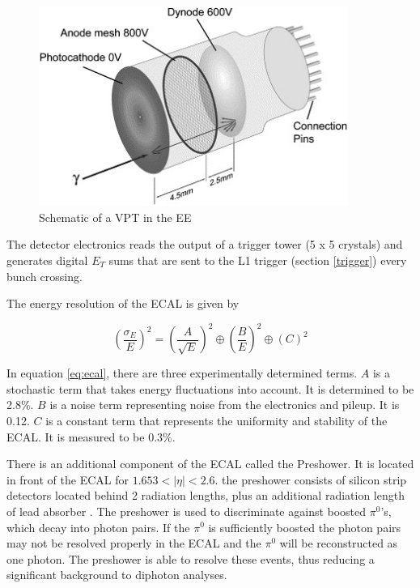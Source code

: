 \documentclass[oneside, letterpaper, oldfontcommands]{memoir}
\begin{document}
\begin{figure}[here]
\includegraphics[width=0.9\textwidth]{vpt.jpg}
\caption{Schematic of a VPT in the EE  \cite{Brown:2007cg}}
\label{fig:VPT}
\end{figure}

\qquad The detector electronics reads the output of a trigger tower (5 x 5 crystals) and generates digital $E_{T}$ sums that are sent to the L1 trigger (section \ref{trigger}) every bunch crossing.

\qquad The energy resolution of the ECAL is given by 

\begin{equation}
\label{eq:ecal}
\left(\frac{\sigma_{E}}{E}\right)^{2} = \left(\frac{A}{\sqrt{E}}\right)^{2} \oplus \left(\frac{B}{E}\right)^{2} \oplus \left( C \right)^{2}
\end{equation} 


In equation \ref{eq:ecal}, there are three experimentally determined terms. $A$ is a stochastic term that takes energy fluctuations into account. It is determined to be 2.8\%. $B$ is a noise term representing noise from the electronics and pileup. It is 0.12. $C$ is a constant term that represents the uniformity and stability of the ECAL. It is measured to be 0.3\%. 

\qquad There is an additional component of the ECAL called the Preshower. It is located in front of the ECAL for $1.653 < |\eta| < 2.6$. the preshower consists of silicon strip detectors located behind 2 radiation lengths, plus an additional radiation length of lead absorber \cite{Cockerill:2008td}. The preshower is used to discriminate against boosted $\pi^{0}$'s, which decay into photon pairs. If the $\pi^{0}$ is sufficiently boosted the photon pairs may not be resolved properly in the ECAL and the $\pi^{0}$ will be reconstructed as one photon. The preshower is able to resolve these events, thus reducing a significant background to diphoton analyses.
\end{document}
